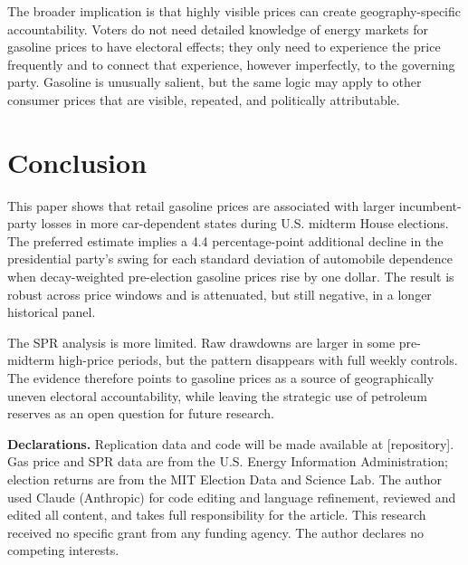 \documentclass[12pt]{article}
\begin{document}
The broader implication is that highly visible prices can create geography-specific accountability. Voters do not need detailed knowledge of energy markets for gasoline prices to have electoral effects; they only need to experience the price frequently and to connect that experience, however imperfectly, to the governing party. Gasoline is unusually salient, but the same logic may apply to other consumer prices that are visible, repeated, and politically attributable.

\section{Conclusion}
\label{sec:conclusion}

This paper shows that retail gasoline prices are associated with larger incumbent-party losses in more car-dependent states during U.S. midterm House elections. The preferred estimate implies a 4.4 percentage-point additional decline in the presidential party's swing for each standard deviation of automobile dependence when decay-weighted pre-election gasoline prices rise by one dollar. The result is robust across price windows and is attenuated, but still negative, in a longer historical panel.

The SPR analysis is more limited. Raw drawdowns are larger in some pre-midterm high-price periods, but the pattern disappears with full weekly controls. The evidence therefore points to gasoline prices as a source of geographically uneven electoral accountability, while leaving the strategic use of petroleum reserves as an open question for future research.

\bigskip
\noindent\begingroup\footnotesize
\textbf{Declarations.} Replication data and code will be made available at [repository]. Gas price and SPR data are from the U.S. Energy Information Administration; election returns are from the MIT Election Data and Science Lab. The author used Claude (Anthropic) for code editing and language refinement, reviewed and edited all content, and takes full responsibility for the article. This research received no specific grant from any funding agency. The author declares no competing interests.
\par\endgroup
\end{document}
